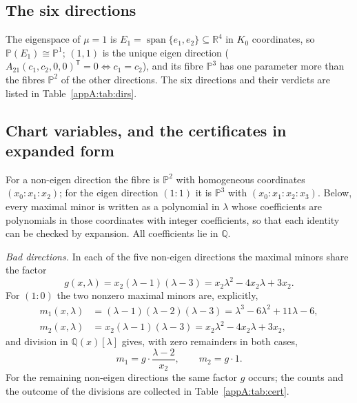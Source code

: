 \documentclass[journal]{IEEEtran}
\theoremstyle{plainn}
\theoremstyle{remark}
\begin{document}
\subsection{The six directions}
\label{appA:six}
The eigenspace of $\mu=1$ is $E_1=\operatorname{span}\{e_1,e_2\}\subseteq\mathbb R^4$ in $K_0$
coordinates, so $\mathbb P(E_1)\cong\mathbb P^1$; $(1,1)$ is the unique eigen direction
($A_{21}(c_1,c_2,0,0)^{\mathsf T}=0\iff c_1=c_2$), and its fibre $\mathbb P^3$ has one parameter more
than the fibres $\mathbb P^2$ of the other directions. The six directions and their verdicts are listed
in Table~\ref{appA:tab:dirs}.
\subsection{Chart variables, and the certificates in expanded form}
\label{appA:certificates}
For a non-eigen direction the fibre is $\mathbb P^2$ with homogeneous coordinates $(x_0\!:\!x_1\!:\!x_2)$;
for the eigen direction $(1\!:\!1)$ it is $\mathbb P^3$ with $(x_0\!:\!x_1\!:\!x_2\!:\!x_3)$. Below,
every maximal minor is written as a polynomial in $\lambda$ whose coefficients are polynomials in those
coordinates with integer coefficients, so that each identity can be checked by expansion. All
coefficients lie in $\mathbb Q$.

\emph{Bad directions.} In each of the five non-eigen directions the maximal minors share the factor
\begin{equation}\label{appA:eq:g}
g(x,\lambda)=x_2(\lambda-1)(\lambda-3)=x_2\lambda^2-4x_2\lambda+3x_2 .
\end{equation}
For $(1\!:\!0)$ the two nonzero maximal minors are, explicitly,
\begin{align}
m_1(x,\lambda)&=(\lambda-1)(\lambda-2)(\lambda-3)=\lambda^3-6\lambda^2+11\lambda-6,
\label{appA:eq:m1}\\
m_2(x,\lambda)&=x_2(\lambda-1)(\lambda-3)=x_2\lambda^2-4x_2\lambda+3x_2,
\label{appA:eq:m2}
\end{align}
and division in $\mathbb Q(x)[\lambda]$ gives, with zero remainders in both cases,
\begin{equation}\label{appA:eq:divcert}
m_1=g\cdot\frac{\lambda-2}{x_2},\qquad m_2=g\cdot 1 .
\end{equation}
For the remaining non-eigen directions the same factor $g$ occurs; the counts and the outcome of the
divisions are collected in Table~\ref{appA:tab:cert}.
\end{document}
